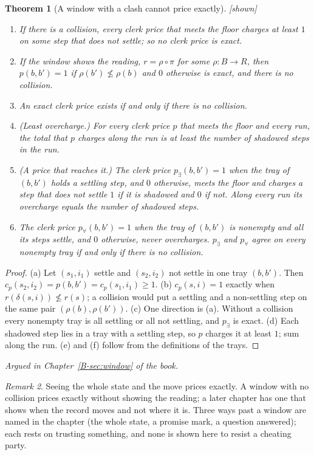 \documentclass[11pt, a4paper]{article}
\theoremstyle{plain}
\newtheorem{theorem}{Theorem}[section]
\theoremstyle{definition}
\theoremstyle{remark}
\newtheorem{remark}[theorem]{Remark}
\newcommand{\step}{\delta}
\newcommand{\cost}{c}
\newcommand{\rd}{r}
\newcommand{\argued}[1]{\par\noindent\textit{Argued in Chapter~\ref{B-#1} of the book.}\par}
\newcommand{\kind}[1]{\textup{[#1]}}
\begin{document}
\begin{theorem}[A window with a clash cannot price exactly]\label{spec:clerk} \kind{shown}
\leavevmode
\begin{enumerate}[label=(\alph*)]
\item If there is a collision, every clerk price that meets the floor charges at least $1$ on some step that
does not settle; so no clerk price is exact.
\item If the window shows the reading, $\rd=\rho\circ\pi$ for some $\rho:B\to R$, then
$p(b,b')=1$ if $\rho(b')\not\le\rho(b)$ and $0$ otherwise is exact, and there is no collision.
\item An exact clerk price exists if and only if there is no collision.
\item (Least overcharge.) For every clerk price $p$ that meets the floor and every run, the total that $p$
charges along the run is at least the number of shadowed steps in the run.
\item (A price that reaches it.) The clerk price $p_\exists(b,b')=1$ when the tray of $(b,b')$ holds a settling
step, and $0$ otherwise, meets the floor and charges a step that does not settle $1$ if it is shadowed and
$0$ if not. Along every run its overcharge equals the number of shadowed steps.
\item The clerk price $p_\forall(b,b')=1$ when the tray of $(b,b')$ is nonempty and all its steps settle,
and $0$ otherwise, never overcharges. $p_\exists$ and $p_\forall$ agree on every nonempty tray if and only if
there is no collision.
\end{enumerate}
\end{theorem}
\begin{proof}
(a) Let $(s_1,i_1)$ settle and $(s_2,i_2)$ not settle in one tray $(b,b')$. Then
$\cost_p(s_2,i_2)=p(b,b')=\cost_p(s_1,i_1)\ge1$. (b) $\cost_p(s,i)=1$ exactly when
$\rd(\step(s,i))\not\le\rd(s)$; a collision would put a settling and a non-settling step on the same pair
$(\rho(b),\rho(b'))$. (c) One direction is (a). Without a collision every nonempty tray is all settling or
all not settling, and $p_\exists$ is exact. (d) Each shadowed step lies in a tray with a settling step, so
$p$ charges it at least $1$; sum along the run. (e) and (f) follow from the definitions of the trays.
\end{proof}
\argued{sec:window}

\begin{remark}\label{spec:window-not-claimed}
Seeing the whole state and the move prices exactly. A window with no collision prices exactly without
showing the reading; a later chapter has one that shows when the record moves and not where it is. Three ways past a window are named in the chapter (the whole state, a promise mark, a question
answered); each rests on trusting something, and none is shown here to resist a cheating party.
\end{remark}
\end{document}
